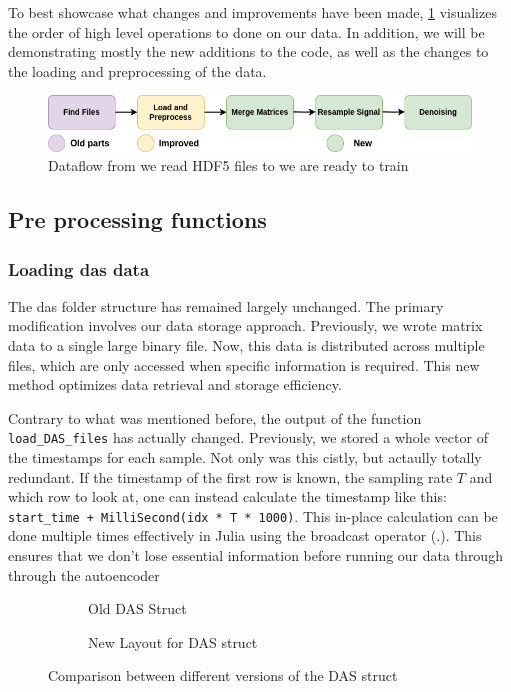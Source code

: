 To best showcase what changes and improvements have been made, \ref{fig:apiflow} visualizes the order of high level operations to done on our data. In addition, we will be demonstrating mostly the new additions to the code, as well as the changes to the loading and preprocessing of the data. \\

\begin{figure}[!h]
    \centering
    \includegraphics[scale=0.5]{figures/dataflow.png}
    \caption{Dataflow from we read HDF5 files to we are ready to train}
    \label{fig:apiflow}
\end{figure}

\subsection{Pre processing functions}

\subsubsection{Loading \acrshort{das} data}

The \acrshort{das} folder structure has remained largely unchanged. The primary modification involves our data storage approach. Previously, we wrote matrix data to a single large binary file. Now, this data is distributed across multiple files, which are only accessed when specific information is required. This new method optimizes data retrieval and storage efficiency.

Contrary to what was mentioned before, the output of the function \texttt{load\_DAS\_files} has actually changed. Previously, we stored a whole vector of the timestamps for each sample. Not only was this cistly, but actaully totally redundant. If the timestamp of the first row is known, the sampling rate $T$ and which row to look at, one can instead calculate the timestamp like this: 
\lstinline|start_time + MilliSecond(idx * T * 1000)|. This in-place calculation can be done multiple times effectively in Julia using the broadcast operator (.). This ensures that we don't lose essential information before running our data through through the autoencoder

\begin{figure}[!h]
\centering
\begin{subfigure}{.45\textwidth}
  \centering
  
  \caption{Old DAS Struct}
  \label{fig:olddasstc}
\end{subfigure}%
\hfill
\begin{subfigure}{.45\textwidth}
  \centering
  
  \caption{New Layout for DAS struct}
  \label{fig:newdasstc}
\end{subfigure}
\caption{Comparison between different versions of the DAS struct}
\label{fig:dasstccmp}
\end{figure}

